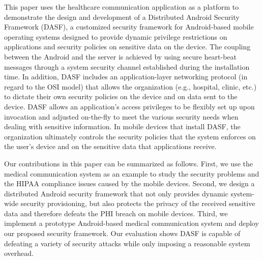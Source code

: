 This paper uses the healthcare communication application as a platform
to demonstrate the design and development of a Distributed
Android Security Framework (DASF), a customized security framework for
Android-based mobile operating systems designed to provide dynamic
privilege restrictions on applications and security policies on
sensitive data on the device. The coupling between the Android and the
server is achieved by using secure heart-beat messages through a system
security channel established during the installation time. 
In addition, DASF includes an
application-layer networking protocol (in regard to the OSI model)
that allows the organization (e.g., hospital, clinic, etc.) to dictate
their own security policies on the device and on data sent to the
device. DASF allows an application’s access privileges to be flexibly
set up upon invocation and adjusted on-the-fly to meet the various
security needs when dealing with sensitive information. In mobile
devices that install DASF, the organization ultimately controls the
security policies that the system enforces on the user’s device and on
the sensitive data that applications receive.

\begin{comment}
Therefore, the contributions that this paper provides are as
follows.  First, this paper provides a security policy
for dynamic system-wide privilege restrictions to be
enforced on applications.  Second, this paper also provides
a security policy that can be enforced on sensitive data.
The aforementioned security policies can either be utilized
by a server communicating with the mobile device or 
by a developer who is creating an application.
\end{comment}
Our contributions in this paper can be summarized as follows. First,
we use the medical communication system as an example to study the
security problems and the HIPAA compliance issues caused by the
mobile devices.  Second,
we design a distributed Android security framework that not only
provides dynamic system-wide security provisioning, but also protects
the privacy of the received sensitive data and therefore defeats
the PHI breach on mobile devices.  Third, we implement
a prototype Android-based medical communication system and deploy our
proposed security framework.  Our evaluation shows DASF is capable of
defeating a variety of security attacks while only imposing a reasonable
system overhead.


